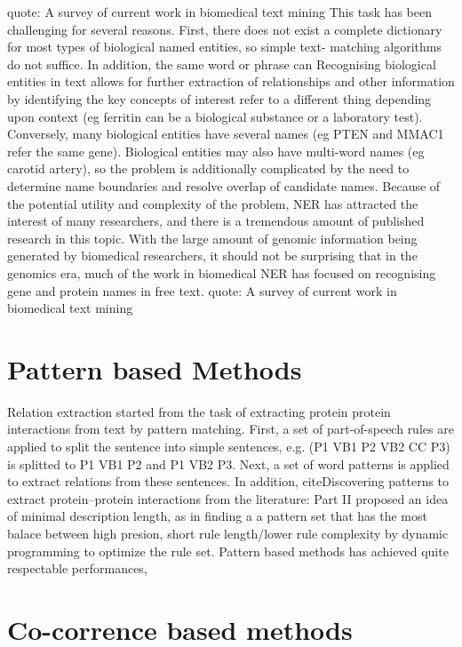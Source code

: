 quote: A survey of current work in biomedical text mining
This task has been challenging for several reasons. First, there does not exist a complete dictionary for most types of biological named entities, so simple text- matching algorithms do not suffice. In addition, the same word or phrase can
Recognising biological entities in text allows for further extraction of relationships and other information by identifying the key concepts of interest
refer to a different thing depending upon context (eg ferritin can be a biological substance or a laboratory test). Conversely, many biological entities have several names (eg PTEN and MMAC1 refer the same gene). Biological entities may also have multi-word names (eg carotid artery), so the problem is additionally complicated by the need to determine name boundaries and resolve overlap of candidate names.
Because of the potential utility and complexity of the problem, NER has attracted the interest of many researchers, and there is a tremendous amount of published research in this topic. With the large amount of genomic information being generated by biomedical researchers, it should not be surprising that in the genomics era, much of the work in biomedical NER has focused on recognising gene and protein names in free text.
quote: A survey of current work in biomedical text mining

\section{Pattern based Methods}
Relation extraction started from the task of extracting protein protein interactions from text by pattern matching. 
First, a set of part-of-speech rules are applied to split the sentence into simple sentences, e.g. (P1 VB1 P2 VB2 CC P3) is splitted to P1 VB1 P2 and P1 VB2 P3. Next, a set of word patterns is applied to extract relations from these sentences. In addition, cite{Discovering patterns to extract protein–protein interactions
from the literature: Part II} proposed an idea of minimal description length, as in finding a a pattern set that has the most balace between high presion, short rule length/lower rule complexity by dynamic programming to optimize the rule set.  Pattern based methods has achieved quite respectable performances, 



\section{Co-corrence based methods}
